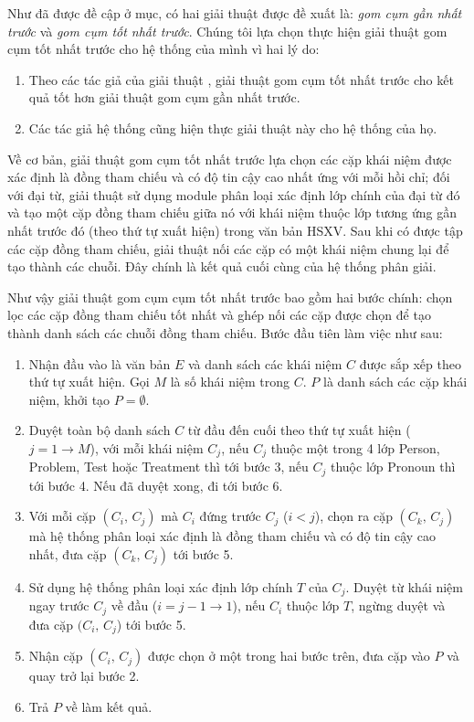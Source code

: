 Như đã được đề cập ở mục, có hai giải thuật được đề xuất là: \emph{gom cụm gần nhất trước} và \emph{gom cụm tốt nhất trước}. Chúng tôi lựa chọn thực hiện giải thuật gom cụm tốt nhất trước cho hệ thống của mình vì hai lý do:
\begin{enumerate}
\item Theo các tác giả của giải thuật \cite{VincentNg2002}, giải thuật gom cụm tốt nhất trước cho kết quả tốt hơn giải thuật gom cụm gần nhất trước.
\item Các tác giả hệ thống \cite{YanXu2012} cũng hiện thực giải thuật này cho hệ thống của họ.
\end{enumerate}

Về cơ bản, giải thuật gom cụm tốt nhất trước lựa chọn các cặp khái niệm được xác định là đồng tham chiếu và có độ tin cậy cao nhất ứng với mỗi hồi chỉ; đối với đại từ, giải thuật sử dụng module phân loại xác định lớp chính của đại từ đó và tạo một cặp đồng tham chiếu giữa nó với khái niệm thuộc lớp tương ứng gần nhất trước đó (theo thứ tự xuất hiện) trong văn bản HSXV. Sau khi có được tập các cặp đồng tham chiếu, giải thuật nối các cặp có một khái niệm chung lại để tạo thành các chuỗi. Đây chính là kết quả cuối cùng của hệ thống phân giải.

Như vậy giải thuật gom cụm cụm tốt nhất trước bao gồm hai bước chính: chọn lọc các cặp đồng tham chiếu tốt nhất và ghép nối các cặp được chọn để tạo thành danh sách các chuỗi đồng tham chiếu. Bước đầu tiên làm việc như sau:
\begin{enumerate}
\item Nhận đầu vào là văn bản $E$ và danh sách các khái niệm $C$ được sắp xếp theo thứ tự xuất hiện. Gọi $M$ là số khái niệm trong $C$. $P$ là danh sách các cặp khái niệm, khởi tạo $P=\emptyset$.
\item Duyệt toàn bộ danh sách $C$ từ đầu đến cuối theo thứ tự xuất hiện ($j=1\rightarrow M$), với mỗi khái niệm $C_j$, nếu $C_j$ thuộc một trong 4 lớp Person, Problem, Test hoặc Treatment thì tới bước 3, nếu $C_j$ thuộc lớp Pronoun thì tới bước 4. Nếu đã duyệt xong, đi tới bước 6.
\item Với mỗi cặp $(C_i,\,C_j)$ mà $C_i$ đứng trước $C_j$ ($i<j$), chọn ra cặp $(C_k,\,C_j)$ mà hệ thống phân loại xác định là đồng tham chiếu và có độ tin cậy cao nhất, đưa cặp $(C_k,\,C_j)$ tới bước 5.
\item Sử dụng hệ thống phân loại xác định lớp chính $T$ của $C_j$. Duyệt từ khái niệm ngay trước $C_j$ về đầu ($i=j-1\rightarrow 1$), nếu $C_i$ thuộc lớp $T$, ngừng duyệt và đưa cặp $(C_i,\,C_j$) tới bước 5.
\item Nhận cặp $(C_i,\,C_j)$ được chọn ở một trong hai bước trên, đưa cặp vào $P$ và quay trở lại bước 2.
\item Trả $P$ về làm kết quả.
\end{enumerate} 

